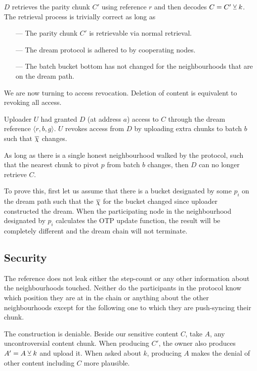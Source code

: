 $D$ retrieves the parity chunk $C'$ using reference $r$ and then decodes $C=C'\veebar k$.
The retrieval process is trivially correct as long as 
\begin{enumerate}[noitemsep]
\item[---]  The parity chunk $C'$ is retrievable via normal retrieval. 
\item[---] The dream protocol is adhered to by cooperating nodes.
\item[---] The batch bucket bottom has not changed for the neighbourhoods that are on the dream path. 
\end{enumerate}

We are now turning to access revocation. Deletion of content is equivalent to revoking all access.


Uploader $U$ had granted $D$ (at address $a$) access to $C$ through the dream reference $\langle r,b,g\rangle $. $U$ revokes access from $D$ by uploading extra chunks to batch $b$ such that $\overline{\Huge\chi}$ changes.

As long as there is a single honest neighbourhood walked by the protocol, such that the nearest chunk to pivot $p$ from batch $b$ changes, then $D$ can no longer retrieve $C$.

To prove this, first let us assume that there is a bucket designated by some $p_i$ on the dream path such that the $\overline{\Huge\chi}$ for the bucket changed since uploader constructed the dream. When the participating node in the neighbourhood designated by $p_i$ calculates the OTP update function, the result will be completely different and the dream chain will not terminate. 

\subsection{Security}


The reference does not leak either the step-count or any other information about the neighbourhoods touched. Neither do the participants in the protocol know which position they are at in the chain or anything  about the other neighbourhoods except for the following one to which they are push-syncing their chunk.

The construction is deniable.
Beside our sensitive content $C$, take $A$, any uncontroversial content chunk. When producing $C'$, the owner also produces  $A'=A\veebar k$ and upload it. When asked about $k$, producing $A$ makes the denial of other content including $C$ more plausible. 


